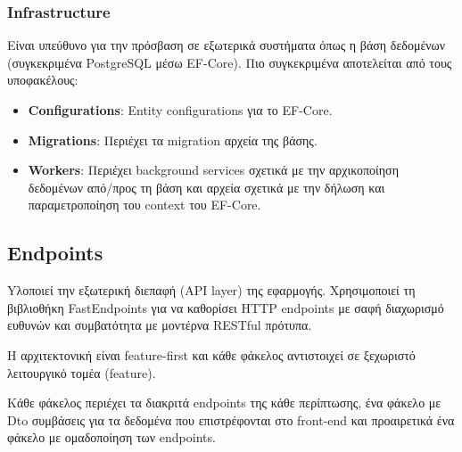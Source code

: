 \subsubsection{\textlatin{Infrastructure}}
Είναι υπεύθυνο για την πρόσβαση σε εξωτερικά συστήματα όπως η βάση δεδομένων (συγκεκριμένα \textlatin{PostgreSQL} μέσω \textlatin{EF-Core}). Πιο συγκεκριμένα αποτελείται από τους υποφακέλους:
\begin{itemize}
    \item \textbf{\textlatin{Configurations}}: \textlatin{Entity configurations} για το \textlatin{EF-Core}.
    \item \textbf{\textlatin{Migrations}}: Περιέχει τα \textlatin{migration} αρχεία της βάσης.
    \item \textbf{\textlatin{Workers}}: Περιέχει \textlatin{background services} σχετικά με την αρχικοποίηση δεδομένων από/προς τη βάση και αρχεία σχετικά με την δήλωση και παραμετροποίηση του \textlatin{context} του \textlatin{EF-Core}.
\end{itemize}


\subsection{\textlatin{Endpoints}}
Yλοποιεί την εξωτερική διεπαφή (\textlatin{API layer}) της εφαρμογής. Χρησιμοποιεί τη βιβλιοθήκη \textlatin{FastEndpoints} για να καθορίσει \textlatin{HTTP endpoints} με σαφή διαχωρισμό ευθυνών και συμβατότητα με μοντέρνα \textlatin{RESTful} πρότυπα.

Η αρχιτεκτονική είναι \textlatin{feature-first} και κάθε φάκελος αντιστοιχεί σε ξεχωριστό λειτουργικό τομέα (\textlatin{feature}).

Κάθε φάκελος περιέχει τα διακριτά \textlatin{endpoints} της κάθε περίπτωσης, ένα φάκελο με \textlatin{Dto} συμβάσεις για τα δεδομένα που επιστρέφονται στο \textlatin{front-end} και προαιρετικά ένα φάκελο με ομαδοποίηση των \textlatin{endpoints}.